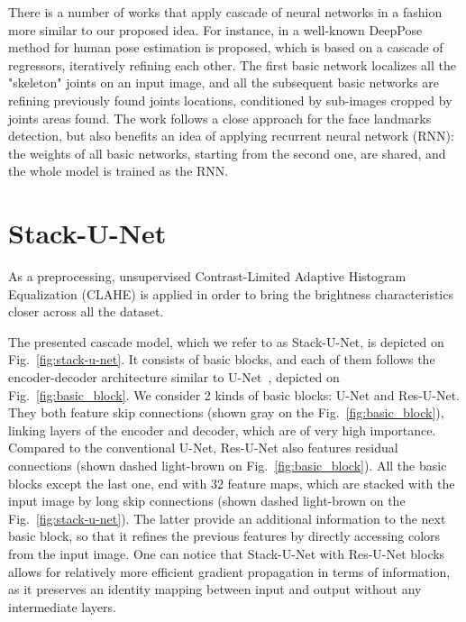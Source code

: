 \documentclass{llncs}
\begin{document}
There is a number of works that apply cascade of neural networks in a fashion more similar to our proposed idea. For instance, in \cite{toshev2014deeppose} a well-known DeepPose method for human pose estimation is proposed, which is based on a cascade of regressors, iteratively refining each other. The first basic network localizes all the "skeleton" joints on an input image, and all the subsequent basic networks are refining previously found joints locations, conditioned by sub-images cropped by joints areas found. The work \cite{trigeorgis2016mnemonic} follows a close approach for the face landmarks detection, but also benefits an idea of applying recurrent neural network (RNN): the weights of all basic networks, starting from the second one, are shared, and the whole model is trained as the RNN.

\section{Stack-U-Net}

As a preprocessing, unsupervised Contrast-Limited Adaptive Histogram Equalization (CLAHE) \cite{szeliski2010computer} is applied in order to bring the brightness characteristics closer across all the dataset. 

The presented cascade model, which we refer to as Stack-U-Net, is depicted on Fig.~\ref{fig:stack-u-net}. It consists of basic blocks, and each of them follows the encoder-decoder architecture similar to U-Net~\cite{ronneberger2015u}, depicted on Fig.~\ref{fig:basic_block}. We consider 2 kinds of basic blocks: U-Net and Res-U-Net. They both feature skip connections (shown gray on the Fig.~\ref{fig:basic_block}), linking layers of the encoder and decoder, which are of very high importance. Compared to the conventional U-Net, Res-U-Net also features residual connections (shown dashed light-brown on Fig.~\ref{fig:basic_block}). All the basic blocks except the last one, end with 32 feature maps, which are stacked with the input image by long skip connections (shown dashed light-brown on the Fig.~\ref{fig:stack-u-net}). The latter provide an additional information to the next basic block, so that it refines the previous features by directly accessing colors from the input image.  One can notice that Stack-U-Net with Res-U-Net blocks allows for relatively more efficient gradient propagation in terms of information, as it preserves an identity mapping \cite{he2016identity,lin2017refinenet} between input and output without any intermediate layers. 
\end{document}
